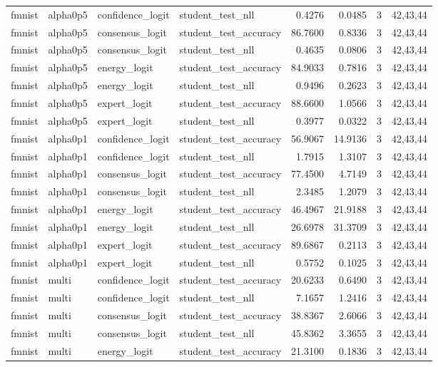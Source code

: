 \begin{tabular}{llllrrrl}
fmnist & alpha0p5 & confidence\_logit & student\_test\_nll & 0.4276 & 0.0485 & 3 & 42,43,44 \\
fmnist & alpha0p5 & consensus\_logit & student\_test\_accuracy & 86.7600 & 0.8336 & 3 & 42,43,44 \\
fmnist & alpha0p5 & consensus\_logit & student\_test\_nll & 0.4635 & 0.0806 & 3 & 42,43,44 \\
fmnist & alpha0p5 & energy\_logit & student\_test\_accuracy & 84.9033 & 0.7816 & 3 & 42,43,44 \\
fmnist & alpha0p5 & energy\_logit & student\_test\_nll & 0.9496 & 0.2623 & 3 & 42,43,44 \\
fmnist & alpha0p5 & expert\_logit & student\_test\_accuracy & 88.6600 & 1.0566 & 3 & 42,43,44 \\
fmnist & alpha0p5 & expert\_logit & student\_test\_nll & 0.3977 & 0.0322 & 3 & 42,43,44 \\
fmnist & alpha0p1 & confidence\_logit & student\_test\_accuracy & 56.9067 & 14.9136 & 3 & 42,43,44 \\
fmnist & alpha0p1 & confidence\_logit & student\_test\_nll & 1.7915 & 1.3107 & 3 & 42,43,44 \\
fmnist & alpha0p1 & consensus\_logit & student\_test\_accuracy & 77.4500 & 4.7149 & 3 & 42,43,44 \\
fmnist & alpha0p1 & consensus\_logit & student\_test\_nll & 2.3485 & 1.2079 & 3 & 42,43,44 \\
fmnist & alpha0p1 & energy\_logit & student\_test\_accuracy & 46.4967 & 21.9188 & 3 & 42,43,44 \\
fmnist & alpha0p1 & energy\_logit & student\_test\_nll & 26.6978 & 31.3709 & 3 & 42,43,44 \\
fmnist & alpha0p1 & expert\_logit & student\_test\_accuracy & 89.6867 & 0.2113 & 3 & 42,43,44 \\
fmnist & alpha0p1 & expert\_logit & student\_test\_nll & 0.5752 & 0.1025 & 3 & 42,43,44 \\
fmnist & multi & confidence\_logit & student\_test\_accuracy & 20.6233 & 0.6490 & 3 & 42,43,44 \\
fmnist & multi & confidence\_logit & student\_test\_nll & 7.1657 & 1.2416 & 3 & 42,43,44 \\
fmnist & multi & consensus\_logit & student\_test\_accuracy & 38.8367 & 2.6066 & 3 & 42,43,44 \\
fmnist & multi & consensus\_logit & student\_test\_nll & 45.8362 & 3.3655 & 3 & 42,43,44 \\
fmnist & multi & energy\_logit & student\_test\_accuracy & 21.3100 & 0.1836 & 3 & 42,43,44 \\

\end{tabular}
